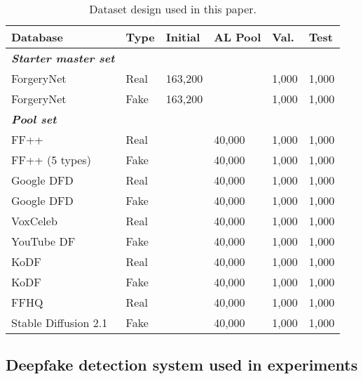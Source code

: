 \documentclass[english]{lni}
\begin{document}
\begin{table}[t!]
\centering
\caption{Dataset design used in this paper.}
\label{tab: databases}
\begin{tabular}{llllll} 
\hline
\textbf{Database} & \textbf{Type} & \textbf{Initial} & \textbf{AL Pool} & \textbf{Val.} & \textbf{Test} \\ 
\hline
\textbf{\textit{Starter master set}}\\
ForgeryNet \cite{he2021forgerynet} & Real & 163,200 &  & 1,000 & 1,000 \\
ForgeryNet \cite{he2021forgerynet} & Fake & 163,200 &  & 1,000 & 1,000 \\ 
\hdashline
\textbf{\textit{Pool set}}\\
FF++ \cite{rossler2019faceforensics++} & Real &  & 40,000 & 1,000 & 1,000 \\
FF++ (5 types) \cite{rossler2019faceforensics++} & Fake &  & 40,000 & 1,000 & 1,000 \\
Google DFD \cite{googledfd} & Real &  & 40,000 & 1,000 & 1,000 \\
Google DFD \cite{googledfd} & Fake &  & 40,000 & 1,000 & 1,000 \\
VoxCeleb \cite{chung2018voxceleb2} & Real &  & 40,000 & 1,000 & 1,000 \\
YouTube DF \cite{kukanov2020cost} & Fake &  & 40,000 & 1,000 & 1,000 \\
KoDF \cite{kwon2021kodf} & Real &  & 40,000 & 1,000 & 1,000 \\
KoDF \cite{kwon2021kodf} & Fake &  & 40,000 & 1,000 & 1,000 \\
FFHQ \cite{karras2019style} & Real &  & 40,000 & 1,000 & 1,000 \\
Stable Diffusion 2.1 \cite{rombach2022high} & Fake &  & 40,000 & 1,000 & 1,000 \\ 
\hline
\end{tabular}
\end{table}

\subsection{Deepfake detection system used in experiments}
\end{document}
